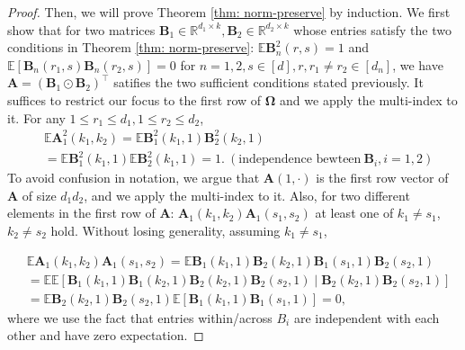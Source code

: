 \begin{proof}
Then, we will prove Theorem \ref{thm: norm-preserve} by induction. 
We first show that for two matrices $\mathbf{B}_1 \in \mathbb{R}^{d_1\times k}, \mathbf{B}_2 \in \mathbb{R}^{d_2\times k}$ whose entries satisfy the two conditions in Theorem \ref{thm: norm-preserve}: $\mathbb{E} \mathbf{B}^2_{n}(r,s)=1$
and  $\mathbb{E} [ \mathbf{B}_{n}(r_1,s)\mathbf{B}_{n}(r_2,s)] =0$ for $n=1,2, s\in [d], r, r_1\neq r_2\in [d_n]$, we have $\mathbf{A} = (\mathbf{B}_1 \odot\mathbf{B}_2 )^\top $ satifies the two sufficient conditions stated previously. It suffices to restrict our focus to the first row of $\mathbf{\Omega}$ and we apply the multi-index to it. For any $1\le r_1\le d_1, 1\le r_2\le d_2$, 
\begin{equation}
\begin{aligned}
&\mathbb{E}  \mathbf{A}^2_{1}(k_1,k_2) = \mathbb{E} \mathbf{B}^2_{1}(k_1,1)\mathbf{B}^2_{2}(k_2,1)\\
& =  \mathbb{E} \mathbf{B}^2_{1}(k_1,1) \mathbb{E} \mathbf{B}^2_{2}(k_1,1) = 1.  ~(\text{independence bewteen} ~ \mathbf{B}_i, i=1,2 )
\nonumber
\end{aligned}
\end{equation}
To avoid confusion in notation, we argue that $ \mathbf{A}(1,\cdot)$ is the first row vector of $ \mathbf{A}$ of size $d_1d_2$, and we apply the multi-index to it.  Also, for two different elements in the first row of $\mathbf{A}$: $ \mathbf{A}_{1}(k_1,k_2) \mathbf{A}_{1}(s_1,s_2)$ at least one of $k_1\neq s_1$, $k_2\neq s_2$ hold. Without losing generality, assuming $k_1\neq s_1$, 

\begin{equation}
\begin{aligned}
&\mathbb{E}  \mathbf{A}_{1}(k_1,k_2) \mathbf{A}_{1}(s_1,s_2)  = \mathbb{E} \mathbf{B}_{1}(k_1,1)\mathbf{B}_{2}(k_2,1)\mathbf{B}_{1}(s_1,1)\mathbf{B}_{2}(s_2,1)\\
& =  \mathbb{E} \mathbb{E}\left[ \mathbf{B}_{1}(k_1,1)\mathbf{B}_{1}(k_2,1)\mathbf{B}_{2}(k_2,1)\mathbf{B}_{2}(s_2,1)  \mid  \mathbf{B}_{2}(k_2,1)\mathbf{B}_{2}(s_2,1)\right]\\
& =  \mathbb{E}  \mathbf{B}_{2}(k_2,1)\mathbf{B}_{2}(s_2,1) \mathbb{E}\left[ \mathbf{B}_{1}(k_1,1)\mathbf{B}_{1}(s_1,1) \right]  = 0,
\nonumber
\end{aligned}
\end{equation}
where we use the fact that entries within/across $B_i$ are independent with each other and have zero expectation. \par 


\end{proof}

